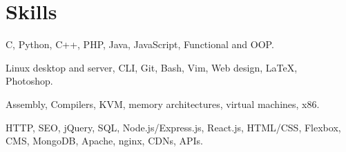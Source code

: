 \section{Skills}
{C, Python, C++, PHP, Java, JavaScript, Functional and OOP.}

{Linux desktop and server, CLI, Git, Bash, Vim, Web design, {\LaTeX},\\ Photoshop.}

{Assembly, Compilers, KVM, memory architectures, virtual machines, x86.}

{HTTP, SEO, jQuery, SQL, Node.js/Express.js, React.js, HTML/CSS, Flexbox, CMS, MongoDB, Apache, nginx, CDNs, APIs.}
